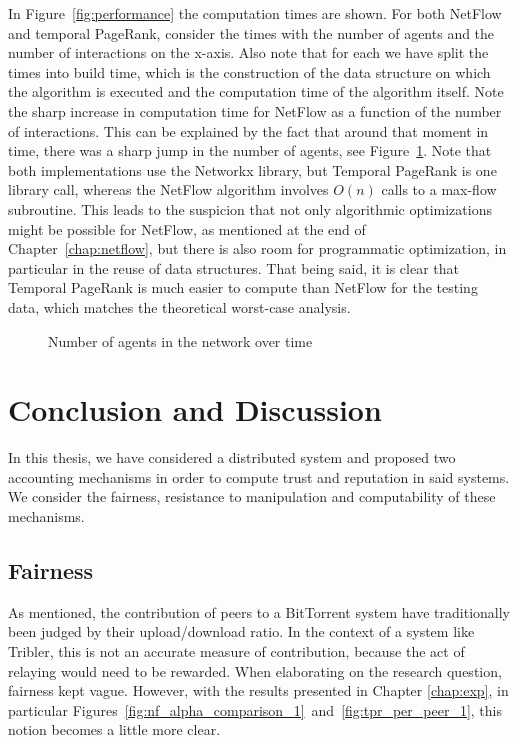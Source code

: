 \documentclass[a4paper,11pt]{book}
\theoremstyle{definition}
\begin{document}
In Figure~\ref{fig:performance} the computation times are shown. For both NetFlow and temporal PageRank,
consider the times with the number of agents and the number of interactions on the x-axis. Also note
that for each we have split the times into build time, which is the construction of the data structure
on which the algorithm is executed and the computation time of the algorithm itself. Note the sharp
increase in computation time for NetFlow as a function of the number of interactions. This can be
explained by the fact that around that moment in time, there was a sharp jump in the number of agents,
see Figure~\ref{fig:evolution}. Note that both implementations use the Networkx library, but 
Temporal PageRank is one library call, whereas the NetFlow algorithm involves $O(n)$ calls to
a max-flow subroutine. This leads to the suspicion that not only algorithmic optimizations might
be possible for NetFlow, as mentioned at the end of Chapter~\ref{chap:netflow}, but there is also
room for programmatic optimization, in particular in the reuse of data structures. That
being said, it is clear that Temporal PageRank is much easier to compute than NetFlow for 
the testing data, which matches the theoretical worst-case analysis.

\begin{figure}[ht]
    \centering
    
    \caption{Number of agents in the network over time}
    \label{fig:evolution}
\end{figure}








\chapter{Conclusion and Discussion}
\label{chap:conclusion}

In this thesis, we have considered a distributed system and proposed two accounting mechanisms
in order to compute trust and reputation in said systems. We consider the fairness, resistance
to manipulation and computability of these mechanisms.

\section{Fairness}

As mentioned, the contribution of peers to a BitTorrent system have traditionally been judged by their
upload/download ratio. In the context of a system like Tribler, this is not an accurate
measure of contribution, because the act of relaying would need to be rewarded. When elaborating on
the research question, fairness kept vague. However, with the results
presented in Chapter \ref{chap:exp}, in particular 
Figures~\ref{fig:nf_alpha_comparison_1}~and~\ref{fig:tpr_per_peer_1},
this notion becomes a little more clear. 
\end{document}

